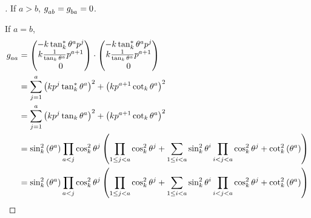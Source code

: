 \documentclass[../main.tex]{subfiles}
\begin{document}
\begin{proof}[]
    If $a>b$, $\tensor{g}{_a_b}=\tensor{g}{_b_a}=0$.

    If $a=b$,
    \begin{align*}
        \tensor{g}{_a_a}
         & =\begin{pmatrix}
                -k\tan_k^\ast\tensor{\theta}{^a}\tensor{p}{^j}         \\
                k\frac{1}{\tan_k\tensor{\theta}{^a}}\tensor{p}{^{a+1}} \\
                0
            \end{pmatrix}\cdot\begin{pmatrix}
                                  -k\tan_k^\ast\tensor{\theta}{^a}\tensor{p}{^j}         \\
                                  k\frac{1}{\tan_k\tensor{\theta}{^a}}\tensor{p}{^{a+1}} \\
                                  0
                              \end{pmatrix} \\
         & =
        \sum_{j=1}^{a}{\left(k\tensor{p}{^j}\tan_k^\ast\tensor{\theta}{^a}\right)^2}
        +\left(k\tensor{p}{^{a+1}}\cot_k\tensor{\theta}{^a}\right)^2                                                       \\
         & =
        \sum_{j=1}^{a}{\left(k\tensor{p}{^j}\tan_k\tensor{\theta}{^a}\right)^2}
        +\left(k\tensor{p}{^{a+1}}\cot_k\tensor{\theta}{^a}\right)^2                                                       \\
         & =
        \sin_k^2\left(\tensor{\theta}{^a}\right)
        \prod_{a<j}{\cos_k^2\tensor{\theta}{^j}}
        \left(
        \prod_{1\le j<a}{\cos_k^2\tensor{\theta}{^j}}
        + \sum_{1\le i<a}{
            \sin_k^2{\tensor{\theta}{^{i}}}\prod_{i<j<a}{\cos_k^2\tensor{\theta}{^j}}
        }
        +\cot_k^2\left(\tensor{\theta}{^a}\right)
        \right)                                                                                                            \\
         & =
        \sin_k^2\left(\tensor{\theta}{^a}\right)
        \prod_{a<j}{\cos_k^2\tensor{\theta}{^j}}
        \left(
        \prod_{1\le j<a}{\cos_k^2\tensor{\theta}{^j}}
        + \sum_{1\le i<a}{
            \sin_k^2{\tensor{\theta}{^{i}}}\prod_{i<j<a}{\cos_k^2\tensor{\theta}{^j}}
        }
        +\cot_k^2\left(\tensor{\theta}{^a}\right)
        \right)                                                                                                            \\

\end{align*}
\end{proof}
\end{document}
